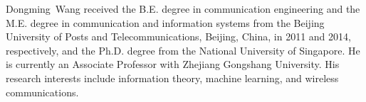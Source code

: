 \documentclass[journal]{IEEEtran}
\begin{document}
   \begin{IEEEbiography}
                         {Dongming~Wang}
      received the B.E. degree in communication engineering and the
      M.E. degree in communication and information
      systems from the Beijing University of Posts and
      Telecommunications, Beijing, China, in 2011 and
      2014, respectively, and the Ph.D. degree from
      the National University of Singapore. He is currently an Associate Professor with Zhejiang Gongshang University. His research interests include
      information theory, machine learning, and wireless communications.
      \end{IEEEbiography}


\end{document}
